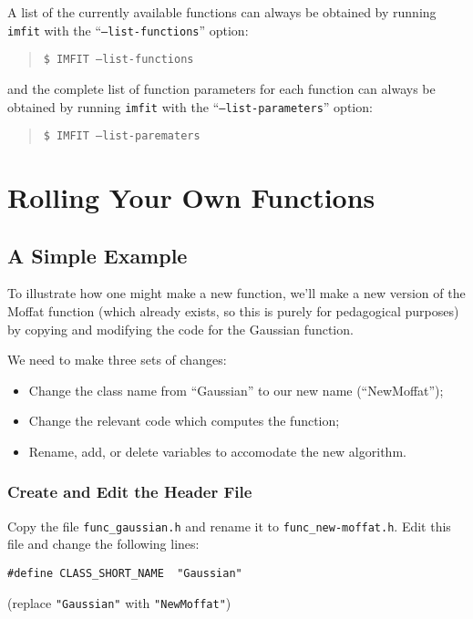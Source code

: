 \documentclass[10pt]{article}
\newcommand{\imfit}{\texttt{imfit}}
\begin{document}
A list of the currently available functions can always be obtained
by running \imfit{} with the ``\texttt{--list-functions}'' option:
\begin{quote}
  \texttt{\$ IMFIT --list-functions}
\end{quote}
and the complete list of function parameters for each function can always be
obtained by running \imfit{} with the ``\texttt{--list-parameters}'' option:
\begin{quote}
  \texttt{\$ IMFIT --list-parematers}
\end{quote}




\section{Rolling Your Own Functions}

\subsection{A Simple Example}

To illustrate how one might make a new function, we'll make a new version of
the Moffat function (which already exists, so this is purely for pedagogical purposes)
by copying and modifying the code for the Gaussian function.

\bigskip

We need to make three sets of changes:
\begin{itemize}
\item Change the class name from ``Gaussian'' to our new name (``NewMoffat'');
\item Change the relevant code which computes the function;
\item Rename, add, or delete variables to accomodate the new algorithm.
\end{itemize}


\subsubsection{Create and Edit the Header File}

Copy the file \texttt{func\_gaussian.h} and rename it to \texttt{func\_new-moffat.h}. 
Edit this file and change the following lines:

\begin{verbatim}
#define CLASS_SHORT_NAME  "Gaussian"
\end{verbatim} 
(replace \texttt{"Gaussian"} with \texttt{"NewMoffat"})
\end{document}
